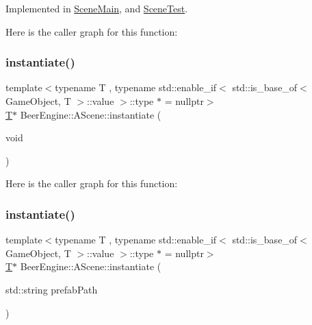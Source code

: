 Implemented in \mbox{\hyperlink{class_scene_main_a4406dc5cf9807edcf360ba416de928e2}{Scene\+Main}}, and \mbox{\hyperlink{class_scene_test_aedded03410798c3705fb3fb028e56ab5}{Scene\+Test}}.

Here is the caller graph for this function\+:
\mbox{\label{class_beer_engine_1_1_a_scene_a2bd087ae22796d1e286c867f4f1ecc38}} 
\subsubsection{\texorpdfstring{instantiate()}{instantiate()}\hspace{0.1cm}{\footnotesize\ttfamily [1/2]}}
{\footnotesize\ttfamily template$<$typename T , typename std\+::enable\+\_\+if$<$ std\+::is\+\_\+base\+\_\+of$<$ Game\+Object, T $>$\+::value $>$\+::type $\ast$  = nullptr$>$ \\
\mbox{\hyperlink{namespace_beer_engine_a94f0b552f6dc910de8cdb44207981f53a8de48e594408f9fc561b2f68ce05f664}{T}}$\ast$ Beer\+Engine\+::\+A\+Scene\+::instantiate (\begin{DoxyParamCaption}\item[{void}]{ }\end{DoxyParamCaption})\hspace{0.3cm}{\ttfamily [inline]}}

Here is the caller graph for this function\+:
\mbox{\label{class_beer_engine_1_1_a_scene_acf89d3198589c3e3007b0bc0579dd9ab}} 
\subsubsection{\texorpdfstring{instantiate()}{instantiate()}\hspace{0.1cm}{\footnotesize\ttfamily [2/2]}}
{\footnotesize\ttfamily template$<$typename T , typename std\+::enable\+\_\+if$<$ std\+::is\+\_\+base\+\_\+of$<$ Game\+Object, T $>$\+::value $>$\+::type $\ast$  = nullptr$>$ \\
\mbox{\hyperlink{namespace_beer_engine_a94f0b552f6dc910de8cdb44207981f53a8de48e594408f9fc561b2f68ce05f664}{T}}$\ast$ Beer\+Engine\+::\+A\+Scene\+::instantiate (\begin{DoxyParamCaption}\item[{std\+::string}]{prefab\+Path }\end{DoxyParamCaption})\hspace{0.3cm}{\ttfamily [inline]}}

